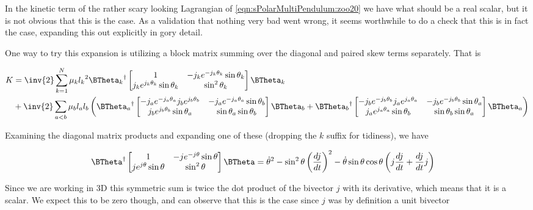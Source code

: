 In the kinetic term of the rather scary looking Lagrangian of \ref{eqn:sPolarMultiPendulum:zoo20} we have what should be a real scalar, but it is not obvious that this is the case.  As a validation that nothing very bad went wrong, it seems worthwhile to do a check that this is in fact the case, expanding this out explicitly in gory detail.

One way to try this expansion is utilizing a block matrix summing over the diagonal and paired skew terms separately.  That is

\begin{align*}
K &=
\inv{2}
\sum_{k=1}^N
\mu_k
{l_k}^2
{\BTheta_k}^\dagger
\begin{bmatrix}
1 & - j_k e^{-j_k \theta_k} \sin\theta_k \\
j_k e^{j_k \theta_k} \sin\theta_k & \sin^2\theta_k 
\end{bmatrix}
\BTheta_k \\
&+
\inv{2}
\sum_{a<b}
\mu_b
l_a l_b
\left(
{\BTheta_a}^\dagger
\begin{bmatrix}
- j_a e^{-j_a \theta_a} j_b e^{j_b\theta_b} & - j_a e^{-j_a \theta_a} \sin\theta_b \\
j_b e^{j_b \theta_b} \sin\theta_a & \sin\theta_a \sin\theta_b
\end{bmatrix}
\BTheta_b 
+
{\BTheta_b}^\dagger
\begin{bmatrix}
- j_b e^{-j_b \theta_b} j_a e^{j_a\theta_a} & - j_b e^{-j_b \theta_b} \sin\theta_a \\
j_a e^{j_a \theta_a} \sin\theta_b & \sin\theta_b \sin\theta_a
\end{bmatrix}
\BTheta_a
\right)
\end{align*}

Examining the diagonal matrix products and expanding one of these (dropping the $k$ suffix for tidiness), we have

\begin{align}\label{eqn:sPolarMultiPendulum:moo1}
{\BTheta}^\dagger
\begin{bmatrix}
1 & - j e^{-j \theta} \sin\theta \\
j e^{j \theta} \sin\theta & \sin^2\theta 
\end{bmatrix}
\BTheta 
&=
\dot{\theta}^2 -\sin^2\theta \left(\frac{dj}{dt}\right)^2 - \dot{\theta} \sin\theta\cos\theta \left( j \frac{dj}{dt} + \frac{dj}{dt} j \right)
\end{align}

Since we are working in 3D this symmetric sum is twice the dot product of the bivector $j$ with its derivative, which means that it is a scalar.  We expect this to be zero though, and can observe that this is the case since $j$ was by definition a unit bivector

